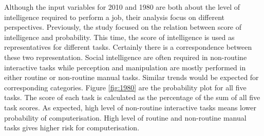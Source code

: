 \documentclass[11pt]{report}
\numberwithin{equation}{chapter}
\begin{document}
\begin{spacing}{2}
Although the input variables for 2010 and 1980 are both about the level of intelligence required to perform a job, their analysis focus on different perspectives. Previously, the study focused on the relation between score of intelligence and probability. This time, the score of intelligence is used as representatives for different tasks. Certainly there is a  correspondence between these two representation. Social intelligence are often required in non-routine interactive tasks while perception and manipulation are mostly performed in either routine or non-routine manual tasks. Similar trends would be expected for corresponding categories. Figure \ref{fig:1980} are the probability plot for all five tasks. The score of each task is calculated as the percentage of the sum of all five task scores. As expected, high level of non-routine interactive tasks means lower probability of computerisation. High level of routine and non-routine manual tasks gives higher risk for computerisation.

\begin{figure}[!htb]


\end{figure}
\end{spacing}
\end{document}
